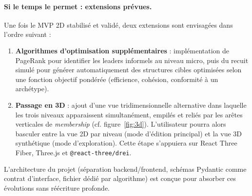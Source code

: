 \documentclass[11pt,a4paper]{article}
\begin{document}
\paragraph{Si le temps le permet : extensions prévues.} Une fois le MVP 2D stabilisé et validé, deux extensions sont envisagées dans l'ordre suivant :

\begin{enumerate}[leftmargin=*]
    \item \textbf{Algorithmes d'optimisation supplémentaires} : implémentation de PageRank pour identifier les leaders informels au niveau micro, puis du recuit simulé pour générer automatiquement des structures cibles optimisées selon une fonction objectif pondérée (efficience, cohésion, conformité à un archétype).
    \item \textbf{Passage en 3D} : ajout d'une vue tridimensionnelle alternative dans laquelle les trois niveaux apparaissent simultanément, empilés et reliés par les arêtes verticales de \textit{membership} (cf. figure~\ref{fig:3d}). L'utilisateur pourra alors basculer entre la vue 2D par niveau (mode d'édition principal) et la vue 3D synthétique (mode d'exploration). Cette étape s'appuiera sur React Three Fiber, Three.js et \texttt{@react-three/drei}.
\end{enumerate}

L'architecture du projet (séparation backend/frontend, schémas Pydantic comme contrat d'interface, fichier dédié par algorithme) est conçue pour absorber ces évolutions sans réécriture profonde.
\end{document}
